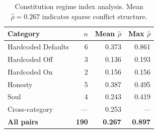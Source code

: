 \begin{table}[h]
\centering
\caption{Constitution regime index analysis. Mean $\hat{\rho} = 0.267$ indicates sparse conflict structure.}
\label{tab:constitution_rho}
\begin{tabular}{lrrr}
\toprule
Category & $n$ & Mean $\hat{\rho}$ & Max $\hat{\rho}$ \\
\midrule
Hardcoded Defaults & 6 & 0.373 & 0.861 \\
Hardcoded Off & 3 & 0.136 & 0.193 \\
Hardcoded On & 2 & 0.156 & 0.156 \\
Honesty & 5 & 0.387 & 0.495 \\
Soul & 4 & 0.243 & 0.419 \\
\midrule
Cross-category & --- & 0.253 & --- \\
\midrule
\textbf{All pairs} & \textbf{190} & \textbf{0.267} & \textbf{0.897} \\
\bottomrule
\end{tabular}
\end{table}